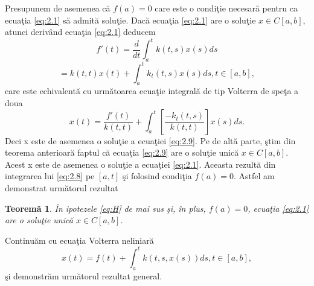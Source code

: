 \documentclass[a4paper,12pt,oneside]{report}
\newtheorem{theorem}{Teorem\u a}
\begin{document}
Presupunem de asemenea c\u{a} \(f\left ( a \right ) = 0\) care este o condi\c{t}ie necesar\u{a} pentru ca ecua\c{t}ia \ref{eq:2.1} s\u{a} admit\u{a} solu\c{t}ie. Dac\u{a} ecua\c{t}ia \ref{eq:2.1} are o solu\c{t}ie \(x\in C\left [ a,b \right ]\), atunci deriv\^{a}nd ecua\c{t}ia \ref{eq:2.1} deducem
\begin{displaymath}
{f}'\left ( t \right ) = \frac{d}{dt}\int_{a}^{t}k\left ( t,s \right )x\left ( s \right )ds \label{eq:2.8} \tag{2.8}
\end{displaymath}
\begin{displaymath}
= k\left ( t,t \right )x\left ( t \right ) + \int_{a}^{t} k_{t}\left ( t,s \right )x\left ( s \right )ds, t\in \left [ a,b \right ],
\end{displaymath}
care este echivalent\u{a} cu urm\u{a}toarea ecua\c{t}ie integral\u{a} de tip Volterra de spe\c{t}a a doua
\begin{displaymath}
x\left ( t \right ) = \frac{{f}'\left ( t \right )}{k\left ( t,t  \right )} + \int_{a}^{t} \left [ \frac{-k_{t}\left ( t,s \right )}{k\left ( t,t \right )} \right ]x\left ( s \right )ds. \label{eq:2.9} \tag{2.9}
\end{displaymath}
Deci x este  de asemenea  o solu\c{t}ie a ecua\c{t}iei \ref{eq:2.9}. Pe de alt\u{a} parte, \c{s}tim din teorema anterioar\u{a} faptul c\u{a} ecua\c{t}ia \ref{eq:2.9} are o solu\c{t}ie unic\u{a} \(x\in C\left [ a,b \right ]\). Acest x  este  de asemenea  o solu\c{t}ie a ecua\c{t}iei \ref{eq:2.1}. Aceasta rezult\u{a} din integrarea lui \ref{eq:2.8} pe \(\left [ a,t \right ]\) \c{s}i folosind condi\c{t}ia \(f\left ( a \right ) = 0\). Astfel am demonstrat urm\u{a}torul rezultat


\begin{theorem}
\^{I}n ipotezele \ref{eq:H} de mai sus \c{s}i, \^{i}n plus, \(f\left ( a \right ) = 0\), ecua\c{t}ia \ref{eq:2.1} are o solu\c{t}ie unic\u{a} \(x \in C\left [ a,b \right ]\).
\end{theorem}
\noindent Continu\u{a}m cu ecua\c{t}ia Volterra neliniar\u{a}
\begin{displaymath}
x\left ( t \right ) = f\left ( t \right ) + \int_{a}^{t}k\left ( t,s,x\left ( s \right ) \right )ds, t\in \left [ a,b \right ], \label{eq:2.10} \tag{2.10}
\end{displaymath}
\c{s}i demonstr\u{a}m urm\u{a}torul rezultat general.
\end{document}

